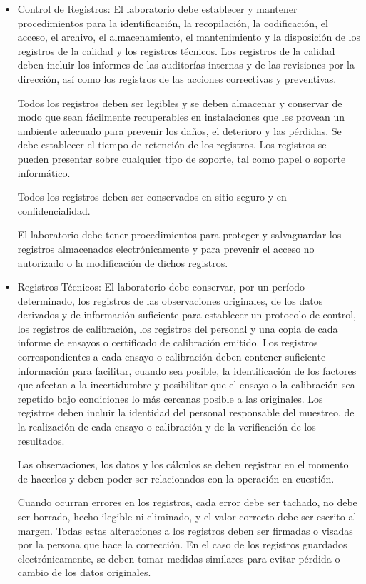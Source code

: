 \begin{itemize}
	\item Control de Registros: El laboratorio debe establecer y mantener procedimientos para la identificación, la recopilación,
	la codificación, el acceso, el archivo, el almacenamiento, el mantenimiento y la disposición de los registros de
	la calidad y los registros técnicos. Los registros de la calidad deben incluir los informes de las auditorías
	internas y de las revisiones por la dirección, así como los registros de las acciones correctivas y preventivas.
	
	\par \noindent
	Todos los registros deben ser legibles y se deben almacenar y conservar de modo que sean
	fácilmente recuperables en instalaciones que les provean un ambiente adecuado para prevenir los daños, el deterioro y las pérdidas. Se debe establecer el tiempo de retención de los registros. Los registros se pueden presentar sobre cualquier tipo de soporte, tal como papel o soporte informático.
	
	\par \noindent
	Todos los registros deben ser conservados en sitio seguro y en confidencialidad.
	
	\par \noindent
	El laboratorio debe tener procedimientos para proteger y salvaguardar los registros almacenados
	electrónicamente y para prevenir el acceso no autorizado o la modificación de dichos registros.
	
	\item Registros Técnicos: El laboratorio debe conservar, por un período determinado, los registros de las observaciones
	originales, de los datos derivados y de información suficiente para establecer un protocolo de control, los
	registros de calibración, los registros del personal y una copia de cada informe de ensayos o certificado de
	calibración emitido. Los registros correspondientes a cada ensayo o calibración deben contener suficiente
	información para facilitar, cuando sea posible, la identificación de los factores que afectan a la incertidumbre y
	posibilitar que el ensayo o la calibración sea repetido bajo condiciones lo más cercanas posible a las
	originales. Los registros deben incluir la identidad del personal responsable del muestreo, de la realización de
	cada ensayo o calibración y de la verificación de los resultados.
	
	\par \noindent
	Las observaciones, los datos y los cálculos se deben registrar en el momento de hacerlos y
	deben poder ser relacionados con la operación en cuestión.
	
	\par \noindent
	Cuando ocurran errores en los registros, cada error debe ser tachado, no debe ser borrado,
	hecho ilegible ni eliminado, y el valor correcto debe ser escrito al margen. Todas estas alteraciones a los
	registros deben ser firmadas o visadas por la persona que hace la corrección. En el caso de los registros
	guardados electrónicamente, se deben tomar medidas similares para evitar pérdida o cambio de los datos
	originales.
\end{itemize}

